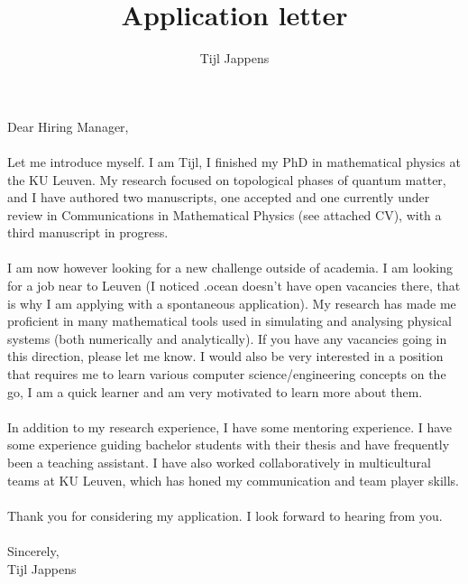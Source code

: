 \documentclass[11pt]{article}
\title{Application letter}
\author{Tijl Jappens}
\begin{document}
\maketitle
Dear Hiring Manager,\\\\
Let me introduce myself. I am Tijl, I finished my PhD in mathematical physics at the KU Leuven. My research focused on topological phases of quantum matter, and I have authored two manuscripts, one accepted and one currently under review in Communications in Mathematical Physics (see attached CV), with a third manuscript in progress.\\\\
I am now however looking for a new challenge outside of academia. I am looking for a job near to Leuven (I noticed .ocean doesn't have open vacancies there, that is why I am applying with a spontaneous application). My research has made me proficient in many mathematical tools used in simulating and analysing physical systems (both numerically and analytically). If you have any vacancies going in this direction, please let me know. I would also be very interested in a position that requires me to learn various computer science/engineering concepts on the go, I am a quick learner and am very motivated to learn more about them.\\\\
In addition to my research experience, I have some mentoring experience. I have some experience guiding bachelor students with their thesis and have frequently been a teaching assistant. I have also worked collaboratively in multicultural teams at KU Leuven, which has honed my communication and team player skills.
\\\\
Thank you for considering my application. I look forward to hearing from you.\\\\
Sincerely,\\
Tijl Jappens
\end{document}
